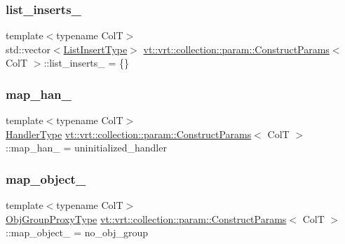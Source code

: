 \subsubsection{\texorpdfstring{list\+\_\+inserts\+\_\+}{list\_inserts\_}}
{\footnotesize\ttfamily template$<$typename ColT$>$ \\
std\+::vector$<$\hyperlink{structvt_1_1vrt_1_1collection_1_1param_1_1_construct_params_aabef3a4ec2a70d29d2b5161daf66e153}{List\+Insert\+Type}$>$ \hyperlink{structvt_1_1vrt_1_1collection_1_1param_1_1_construct_params}{vt\+::vrt\+::collection\+::param\+::\+Construct\+Params}$<$ ColT $>$\+::list\+\_\+inserts\+\_\+ = \{\}\hspace{0.3cm}{\ttfamily [private]}}

\mbox{\label{structvt_1_1vrt_1_1collection_1_1param_1_1_construct_params_adfb5a4ecef96e720c6f8d48ac3f52706}} 
\subsubsection{\texorpdfstring{map\+\_\+han\+\_\+}{map\_han\_}}
{\footnotesize\ttfamily template$<$typename ColT$>$ \\
\hyperlink{namespacevt_af64846b57dfcaf104da3ef6967917573}{Handler\+Type} \hyperlink{structvt_1_1vrt_1_1collection_1_1param_1_1_construct_params}{vt\+::vrt\+::collection\+::param\+::\+Construct\+Params}$<$ ColT $>$\+::map\+\_\+han\+\_\+ = uninitialized\+\_\+handler\hspace{0.3cm}{\ttfamily [private]}}

\mbox{\label{structvt_1_1vrt_1_1collection_1_1param_1_1_construct_params_a91859be49e51c141fd83e27499d5d582}} 
\subsubsection{\texorpdfstring{map\+\_\+object\+\_\+}{map\_object\_}}
{\footnotesize\ttfamily template$<$typename ColT$>$ \\
\hyperlink{namespacevt_ad7cae989df485fccca57f0792a880a8e}{Obj\+Group\+Proxy\+Type} \hyperlink{structvt_1_1vrt_1_1collection_1_1param_1_1_construct_params}{vt\+::vrt\+::collection\+::param\+::\+Construct\+Params}$<$ ColT $>$\+::map\+\_\+object\+\_\+ = no\+\_\+obj\+\_\+group\hspace{0.3cm}{\ttfamily [private]}}

